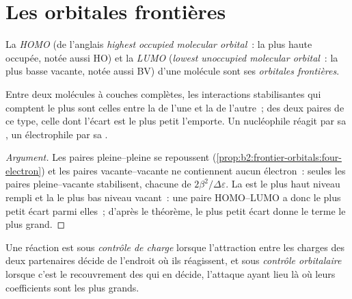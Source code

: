 \section{Les orbitales frontières}

\begin{definition}\label{def:b2:frontier-orbitals:frontier}
La \emph{HOMO} (de l'anglais \textit{highest occupied molecular orbital}~: la plus haute  occupée, notée aussi HO) et la \emph{LUMO} (\textit{lowest unoccupied molecular orbital}~: la plus basse
 vacante, notée aussi BV) d'une molécule sont ses \emph{orbitales frontières}.
\end{definition}

\begin{proposition}\label{prop:b2:frontier-orbitals:dominant}
Entre deux molécules à couches complètes, les interactions stabilisantes qui comptent le plus
sont celles entre la  de l'une et la  de l'autre~; des deux paires de ce type, celle
dont l'écart est le plus petit l'emporte. Un nucléophile réagit par sa , un
électrophile par sa .
\end{proposition}

\begin{proof}[Argument]
Les paires pleine--pleine se repoussent (\cref{prop:b2:frontier-orbitals:four-electron}) et les paires
vacante--vacante ne contiennent aucun électron~: seules les paires pleine--vacante stabilisent, chacune de $2\beta^2/\Delta\varepsilon$.
La  est le plus haut niveau rempli et la  le plus bas niveau vacant~: une
paire HOMO--LUMO a donc le plus petit écart parmi elles~; d'après le théorème, le plus petit écart
donne le terme le plus grand.
\end{proof}

\begin{definition}\label{def:b2:frontier-orbitals:control}
Une réaction est sous \emph{contrôle de charge} lorsque l'attraction
entre les charges des deux partenaires décide de l'endroit où ils réagissent, et sous
\emph{contrôle orbitalaire} lorsque c'est le recouvrement des 
qui en décide, l'attaque ayant lieu là où leurs coefficients sont les plus grands.
\end{definition}

